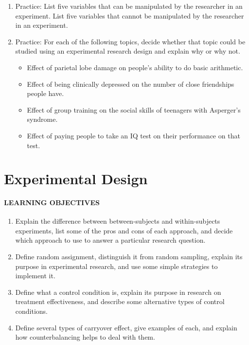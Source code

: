 \documentclass[
]{krantz}
\providecommand{\tightlist}{%
  \setlength{\itemsep}{0pt}\setlength{\parskip}{0pt}}
\begin{document}
\begin{enumerate}
\def\labelenumi{\arabic{enumi}.}
\tightlist
\item
  Practice: List five variables that can be manipulated by the researcher in an experiment. List five variables that cannot be manipulated by the researcher in an experiment.
\item
  Practice: For each of the following topics, decide whether that topic could be studied using an experimental research design and explain why or why not.

  \begin{itemize}
  \tightlist
  \item
    Effect of parietal lobe damage on people's ability to do basic arithmetic.
  \item
    Effect of being clinically depressed on the number of close friendships people have.
  \item
    Effect of group training on the social skills of teenagers with Asperger's syndrome.
  \item
    Effect of paying people to take an IQ test on their performance on that test.
  \end{itemize}
\end{enumerate}

\section{Experimental Design}\label{experimental-design}

\paragraph*{LEARNING OBJECTIVES}\label{learning-objectives-7}

\begin{enumerate}
\def\labelenumi{\arabic{enumi}.}
\tightlist
\item
  Explain the difference between between-subjects and within-subjects experiments, list some of the pros and cons of each approach, and decide which approach to use to answer a particular research question.
\item
  Define random assignment, distinguish it from random sampling, explain its purpose in experimental research, and use some simple strategies to implement it.
\item
  Define what a control condition is, explain its purpose in research on treatment effectiveness, and describe some alternative types of control conditions.
\item
  Define several types of carryover effect, give examples of each, and explain how counterbalancing helps to deal with them.
\end{enumerate}
\end{document}
